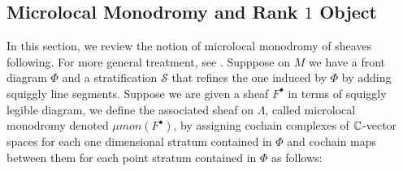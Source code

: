\subsection*{Microlocal Monodromy and Rank $1$ Object}
In this section, we review the notion of microlocal monodromy of sheaves following\cite[Section~5.1]{shende2017legendrian}. For more general treatment, see \cite[Ch.~\MakeUppercase{\Rn{4}}]{kashiwara2013sheaves}. Supppose on $M$ we have a front diagram $\Phi$ and a stratification $\mathcal{S}$ that refines the one induced by $\Phi$ by adding squiggly line segments. Suppose we are given a sheaf $F^\bullet$ in terms of squiggly legible diagram, we define the associated sheaf on $\Lambda$, called microlocal monodromy denoted $\mu mon (F^\bullet)$, by assigning cochain complexes of $\mathbb{C}$-vector spaces for each one dimensional stratum contained in $\Phi$ and cochain maps between them for each point stratum contained in $\Phi$ as follows:

